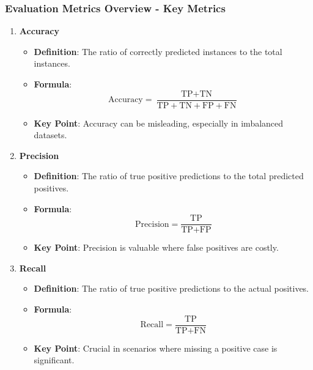 \documentclass[aspectratio=169]{beamer}
\begin{document}
\begin{frame}[fragile]
  \frametitle{Evaluation Metrics Overview - Key Metrics}
  \begin{enumerate}
    \item \textbf{Accuracy}
      \begin{itemize}
        \item \textbf{Definition}: The ratio of correctly predicted instances to the total instances.
        \item \textbf{Formula}:
          \begin{equation}
          \text{Accuracy} = \frac{\text{TP} + \text{TN}}{\text{TP} + \text{TN} + \text{FP} + \text{FN}}
          \end{equation}
        \item \textbf{Key Point}: Accuracy can be misleading, especially in imbalanced datasets.
      \end{itemize}
    
    \item \textbf{Precision}
      \begin{itemize}
        \item \textbf{Definition}: The ratio of true positive predictions to the total predicted positives.
        \item \textbf{Formula}:
          \begin{equation}
          \text{Precision} = \frac{\text{TP}}{\text{TP} + \text{FP}}
          \end{equation}
        \item \textbf{Key Point}: Precision is valuable where false positives are costly.
      \end{itemize}
    
    \item \textbf{Recall}
      \begin{itemize}
        \item \textbf{Definition}: The ratio of true positive predictions to the actual positives.
        \item \textbf{Formula}:
          \begin{equation}
          \text{Recall} = \frac{\text{TP}}{\text{TP} + \text{FN}}
          \end{equation}
        \item \textbf{Key Point}: Crucial in scenarios where missing a positive case is significant.
      \end{itemize}
  \end{enumerate}
\end{frame}
\end{document}
